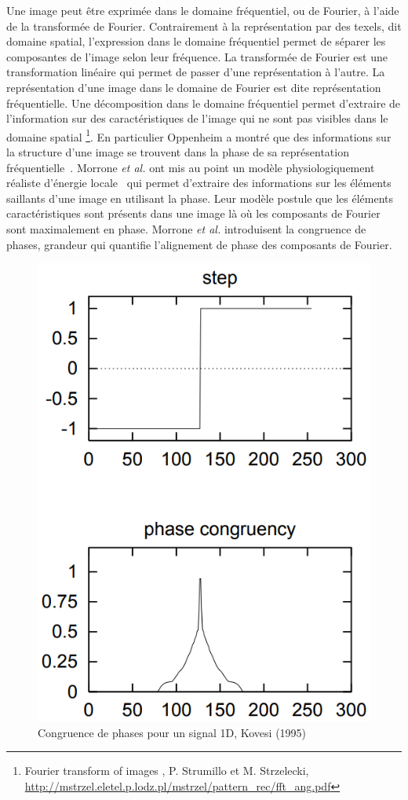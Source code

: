 Une image peut être exprimée dans le domaine fréquentiel, ou de Fourier, à l'aide de la transformée de Fourier. Contrairement à la représentation par des texels, dit domaine spatial, l'expression dans le domaine fréquentiel permet de séparer les composantes de l'image selon leur fréquence. La transformée de Fourier est une transformation linéaire qui permet de passer d'une représentation à l'autre. La représentation d'une image dans le domaine de Fourier est dite représentation fréquentielle. Une décomposition dans le domaine fréquentiel permet d'extraire de l'information sur des caractéristiques de l'image qui ne sont pas visibles dans le domaine spatial \footnote{\og Fourier transform of images \fg, P. Strumillo et M. Strzelecki, \url{http://mstrzel.eletel.p.lodz.pl/mstrzel/pattern_rec/fft_ang.pdf}}. En particulier Oppenheim a montré que des informations sur la structure d'une image se trouvent dans la phase de sa représentation fréquentielle~\cite{oppenheim_importance_1981}. Morrone \textit{et al.} ont mis au point un modèle physiologiquement réaliste d'énergie locale~\cite{morrone_feature_1987, morrone_feature_1988} qui permet d'extraire des informations sur les éléments saillants d'une image en utilisant la phase. Leur modèle postule que les éléments caractéristiques sont présents dans une image là où les composants de Fourier sont maximalement en phase. Morrone \textit{et al.} introduisent la congruence de phases, grandeur qui quantifie l'alignement de phase des composants de Fourier.

\bigskip

\begin{figure}[h]
    \centering
    \includegraphics[width=.35\linewidth]{contenu/resources/images/pc_1d_kovesi}
    \caption[Congruence de phases pour un signal 1D]{Congruence de phases pour un signal 1D, Kovesi (1995)~\cite{kovesi_image_1995}}
    \label{fig:pc-1D-kovesi}
\end{figure}

